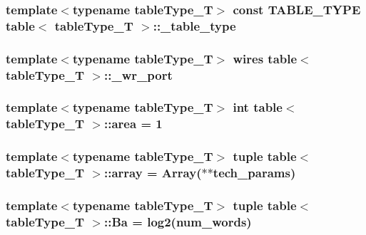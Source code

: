 \label{classtable_a7bb72e9a56072266491b5a125b41ef87}
\hypertarget{classtable_ae804042049b8e94591efe22ae05c0371}{
\subsubsection[{\_\-table\_\-type}]{\setlength{\rightskip}{0pt plus 5cm}template$<$typename tableType\_\-T$>$ const {\bf TABLE\_\-TYPE} {\bf table}$<$ tableType\_\-T $>$::{\bf \_\-table\_\-type}}}
\label{classtable_ae804042049b8e94591efe22ae05c0371}
\hypertarget{classtable_a7c068dc525606b03270d704ea3494f91}{
\subsubsection[{\_\-wr\_\-port}]{\setlength{\rightskip}{0pt plus 5cm}template$<$typename tableType\_\-T$>$ {\bf wires} {\bf table}$<$ tableType\_\-T $>$::{\bf \_\-wr\_\-port}}}
\label{classtable_a7c068dc525606b03270d704ea3494f91}
\hypertarget{classtable_ac8cec3dd028135d3f662c9497f7ad53a}{
\subsubsection[{area}]{\setlength{\rightskip}{0pt plus 5cm}template$<$typename tableType\_\-T$>$ int {\bf table}$<$ tableType\_\-T $>$::{\bf area} = 1}}
\label{classtable_ac8cec3dd028135d3f662c9497f7ad53a}
\hypertarget{classtable_ad970704c6940da68266a55b39ae55528}{
\subsubsection[{array}]{\setlength{\rightskip}{0pt plus 5cm}template$<$typename tableType\_\-T$>$ tuple {\bf table}$<$ tableType\_\-T $>$::{\bf array} = {\bf Array}($\ast$$\ast${\bf tech\_\-params})}}
\label{classtable_ad970704c6940da68266a55b39ae55528}
\hypertarget{classtable_a605882d69786546555960d11c3b4ffb0}{
\subsubsection[{Ba}]{\setlength{\rightskip}{0pt plus 5cm}template$<$typename tableType\_\-T$>$ tuple {\bf table}$<$ tableType\_\-T $>$::{\bf Ba} = log2({\bf num\_\-words})}}
